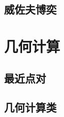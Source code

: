 \documentclass[a4paper, 12pt, twoside]{article}
\begin{document}
\subsection{威佐夫博奕}


\section{几何计算}
\subsection{最近点对}

\subsection{几何计算类}




















\clearpage
\end{document}
